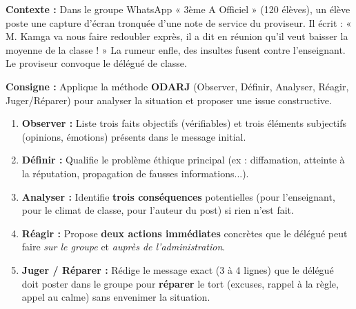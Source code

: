 \documentclass[11pt]{article}
\newcounter{popsec}
\newcounter{popsub}
\newcommand{\courssub}[1]{%
  \stepcounter{popsub}%
  \par\vspace{9pt}\noindent{\popxbold\fontsize{11.5}{13}\selectfont\color{popink}{\color{poporange}\thepopsec.\thepopsub}\hspace{6pt}#1}\par\nopagebreak\vspace{4pt}
}
\begin{document}
\courssub{Je me prépare au BEPC}

\begin{exercice}
\textbf{Contexte :} Dans le groupe WhatsApp « 3ème A Officiel » (120 élèves), un élève poste une capture d'écran tronquée d'une note de service du proviseur. Il écrit : « M. Kamga va nous faire redoubler exprès, il a dit en réunion qu'il veut baisser la moyenne de la classe ! » La rumeur enfle, des insultes fusent contre l'enseignant. Le proviseur convoque le délégué de classe.

\textbf{Consigne :} Applique la méthode \textbf{ODARJ} (Observer, Définir, Analyser, Réagir, Juger/Réparer) pour analyser la situation et proposer une issue constructive.

\begin{enumerate}
\item \textbf{Observer :} Liste trois faits objectifs (vérifiables) et trois éléments subjectifs (opinions, émotions) présents dans le message initial.
\item \textbf{Définir :} Qualifie le problème éthique principal (ex : diffamation, atteinte à la réputation, propagation de fausses informations...).
\item \textbf{Analyser :} Identifie \textbf{trois conséquences} potentielles (pour l'enseignant, pour le climat de classe, pour l'auteur du post) si rien n'est fait.
\item \textbf{Réagir :} Propose \textbf{deux actions immédiates} concrètes que le délégué peut faire \emph{sur le groupe} et \emph{auprès de l'administration}.
\item \textbf{Juger / Réparer :} Rédige le message exact (3 à 4 lignes) que le délégué doit poster dans le groupe pour \textbf{réparer} le tort (excuses, rappel à la règle, appel au calme) sans envenimer la situation.
\end{enumerate}
\end{exercice}
\end{document}
